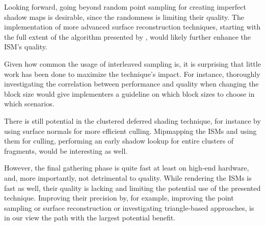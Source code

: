 Looking forward, going beyond random point sampling for creating imperfect shadow maps is desirable, since the randomness is limiting their quality. The implementation of more advanced surface reconstruction techniques, starting with the full extent of the algorithm presented by \citet{Marroquim:2007:reconstruction}, would likely further enhance the ISM's quality.

Given how common the usage of interleaved sampling is, it is surprising that little work has been done to maximize the technique's impact. For instance, thoroughly investigating the correlation between performance and quality when changing the block size would give implementers a guideline on which block sizes to choose in which scenarios.

There is still potential in the clustered deferred shading technique, for instance by using surface normals for more efficient culling. Mipmapping the ISMs and using them for culling, performing an early shadow lookup for entire clusters of fragments, would be interesting as well.

However, the final gathering phase is quite fast at least on high-end hardware, and, more importantly,  not detrimental to quality. While rendering the ISMs is fast as well, their quality is lacking and limiting the potential use of the presented technique. Improving their precision by, for example, improving the point sampling or surface reconstruction or investigating triangle-based approaches, is in our view the path with the largest potential benefit.
